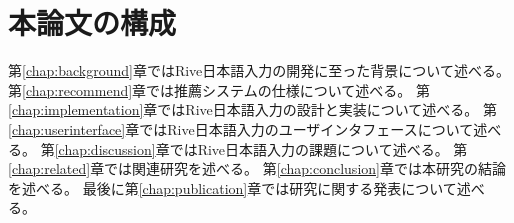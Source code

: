 \section{本論文の構成}
第\ref{chap:background}章ではRive日本語入力の開発に至った背景について述べる。
第\ref{chap:recommend}章では推薦システムの仕様について述べる。
第\ref{chap:implementation}章ではRive日本語入力の設計と実装について述べる。
第\ref{chap:userinterface}章ではRive日本語入力のユーザインタフェースについて述べる。
第\ref{chap:discussion}章ではRive日本語入力の課題について述べる。
第\ref{chap:related}章では関連研究を述べる。
第\ref{chap:conclusion}章では本研究の結論を述べる。
最後に第\ref{chap:publication}章では研究に関する発表について述べる。
